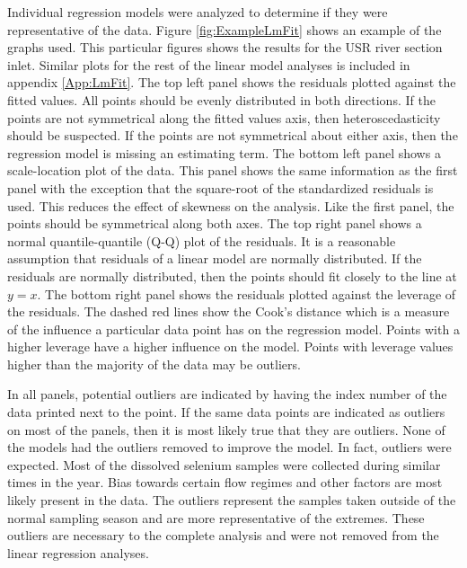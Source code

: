 \begin{linenumbers}
Individual regression models were analyzed to determine if they were representative of the data.  Figure \ref{fig:ExampleLmFit} shows an example of the graphs used.  This particular figures shows the results for the USR river section inlet.  Similar plots for the rest of the linear model analyses is included in appendix \ref{App:LmFit}. The top left panel shows the residuals plotted against the fitted values.  All points should be evenly distributed in both directions.  If the points are not symmetrical along the fitted values axis, then heteroscedasticity should be suspected.  If the points are not symmetrical about either axis, then the regression model is missing an estimating term.  The bottom left panel shows a scale-location plot of the data.  This panel shows the same information as the first panel with the exception that the square-root of the standardized residuals is used.  This reduces the effect of skewness on the analysis.  Like the first panel, the points should be symmetrical along both axes.  The top right panel shows a normal quantile-quantile (Q-Q) plot of the residuals.  It is a reasonable assumption that residuals of a linear model are normally distributed.  If the residuals are normally distributed, then the points should fit closely to the line at $y=x$.  The bottom right panel shows the residuals plotted against the leverage of the residuals.  The dashed red lines show the Cook's distance which is a measure of the influence a particular data point has on the regression model.  Points with a higher leverage have a higher influence on the model.  Points with leverage values higher than the majority of the data may be outliers.

In all panels, potential outliers are indicated by having the index number of the data printed next to the point.  If the same data points are indicated as outliers on most of the panels, then it is most likely true that they are outliers.  None of the models had the outliers removed to improve the model.  In fact, outliers were expected.  Most of the dissolved selenium samples were collected during similar times in the year.  Bias towards certain flow regimes and other factors are most likely present in the data.  The outliers represent the samples taken outside of the normal sampling season and are more representative of the extremes.  These outliers are necessary to the complete analysis and were not removed from the linear regression analyses.


\end{linenumbers}
